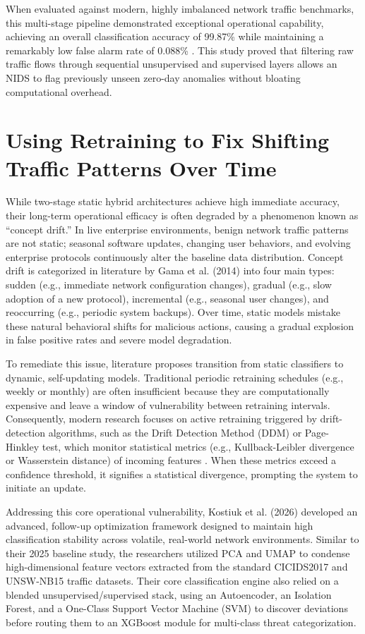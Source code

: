 \documentclass[12pt,a4paper]{report}
\begin{document}
When evaluated against modern, highly imbalanced network traffic benchmarks, this multi-stage pipeline demonstrated exceptional operational capability, achieving an overall classification accuracy of 99.87\% while maintaining a remarkably low false alarm rate of 0.088\% \cite{kostiuk2025}. This study proved that filtering raw traffic flows through sequential unsupervised and supervised layers allows an NIDS to flag previously unseen zero-day anomalies without bloating computational overhead.

\section{Using Retraining to Fix Shifting Traffic Patterns Over Time}

While two-stage static hybrid architectures achieve high immediate accuracy, their long-term operational efficacy is often degraded by a phenomenon known as ``concept drift.'' In live enterprise environments, benign network traffic patterns are not static; seasonal software updates, changing user behaviors, and evolving enterprise protocols continuously alter the baseline data distribution. Concept drift is categorized in literature by Gama et al. (2014) \cite{gama2014} into four main types: sudden (e.g., immediate network configuration changes), gradual (e.g., slow adoption of a new protocol), incremental (e.g., seasonal user changes), and reoccurring (e.g., periodic system backups). Over time, static models mistake these natural behavioral shifts for malicious actions, causing a gradual explosion in false positive rates and severe model degradation.

To remediate this issue, literature proposes transition from static classifiers to dynamic, self-updating models. Traditional periodic retraining schedules (e.g., weekly or monthly) are often insufficient because they are computationally expensive and leave a window of vulnerability between retraining intervals. Consequently, modern research focuses on active retraining triggered by drift-detection algorithms, such as the Drift Detection Method (DDM) or Page-Hinkley test, which monitor statistical metrics (e.g., Kullback-Leibler divergence or Wasserstein distance) of incoming features \cite{gama2014}. When these metrics exceed a confidence threshold, it signifies a statistical divergence, prompting the system to initiate an update.

Addressing this core operational vulnerability, Kostiuk et al. (2026) \cite{kostiuk2026} developed an advanced, follow-up optimization framework designed to maintain high classification stability across volatile, real-world network environments. Similar to their 2025 baseline study, the researchers utilized PCA and UMAP to condense high-dimensional feature vectors extracted from the standard CICIDS2017 and UNSW-NB15 traffic datasets. Their core classification engine also relied on a blended unsupervised/supervised stack, using an Autoencoder, an Isolation Forest, and a One-Class Support Vector Machine (SVM) to discover deviations before routing them to an XGBoost module for multi-class threat categorization.
\end{document}
